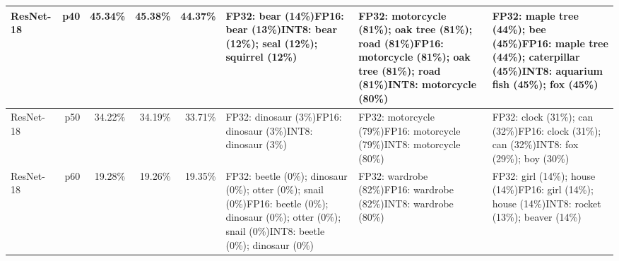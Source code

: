 \begin{longtable}{p{2.8cm} r r r r p{5.0cm} p{4.2cm} p{4.2cm}}
ResNet-18 & p40 & 45.34\% & 45.38\% & 44.37\% & FP32: bear (14\%)\newline FP16: bear (13\%)\newline INT8: bear (12\%); seal (12\%); squirrel (12\%) & FP32: motorcycle (81\%); oak tree (81\%); road (81\%)\newline FP16: motorcycle (81\%); oak tree (81\%); road (81\%)\newline INT8: motorcycle (80\%) & FP32: maple tree (44\%); bee (45\%)\newline FP16: maple tree (44\%); caterpillar (45\%)\newline INT8: aquarium fish (45\%); fox (45\%) \\ \hline
ResNet-18 & p50 & 34.22\% & 34.19\% & 33.71\% & FP32: dinosaur (3\%)\newline FP16: dinosaur (3\%)\newline INT8: dinosaur (3\%) & FP32: motorcycle (79\%)\newline FP16: motorcycle (79\%)\newline INT8: motorcycle (80\%) & FP32: clock (31\%); can (32\%)\newline FP16: clock (31\%); can (32\%)\newline INT8: fox (29\%); boy (30\%) \\ \hline
ResNet-18 & p60 & 19.28\% & 19.26\% & 19.35\% & FP32: beetle (0\%); dinosaur (0\%); otter (0\%); snail (0\%)\newline FP16: beetle (0\%); dinosaur (0\%); otter (0\%); snail (0\%)\newline INT8: beetle (0\%); dinosaur (0\%) & FP32: wardrobe (82\%)\newline FP16: wardrobe (82\%)\newline INT8: wardrobe (80\%) & FP32: girl (14\%); house (14\%)\newline FP16: girl (14\%); house (14\%)\newline INT8: rocket (13\%); beaver (14\%) \\ \hline

\end{longtable}
